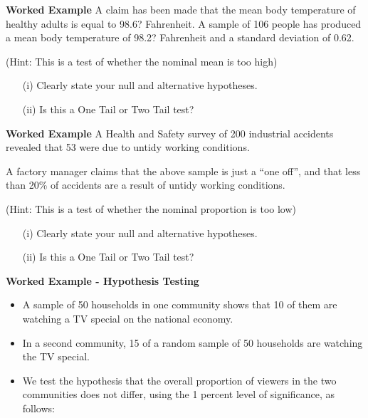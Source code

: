 
\item \textbf{Worked Example}
A claim has been made that the mean body temperature of healthy adults is equal to 98.6? Fahrenheit. A sample of 106 people has produced a mean body temperature of 98.2? Fahrenheit and a standard deviation of 0.62. 

(Hint: This is a test of whether the nominal mean is too high)
\begin{itemize}
\item[(i)] Clearly state your null and alternative hypotheses.
\item[(ii)] Is this a One Tail or Two Tail test?
\end{itemize}

\item \textbf{Worked Example}
A Health and Safety survey of 200 industrial accidents revealed that 53 
were due to untidy working conditions.  

A factory manager claims that the above sample is just a “one off”, and that less than 20\% of accidents are a result of untidy working conditions. 

(Hint: This is a test of whether the nominal proportion is too low)
\begin{itemize}
\item[(i)] Clearly state your null and alternative hypotheses.
\item[(ii)] Is this a One Tail or Two Tail test?
\end{itemize}



\item \textbf{Worked Example   - Hypothesis Testing}

\begin{itemize}
\item A sample of 50 households in one community
shows that 10 of them are watching a TV special on the national
economy. 
\item In a second community, 15 of a random sample of 50
households are watching the TV special. 
\item We test the hypothesis
that the overall proportion of viewers in the two communities does
not differ, using the 1 percent level of significance, as follows:
\end{itemize}

